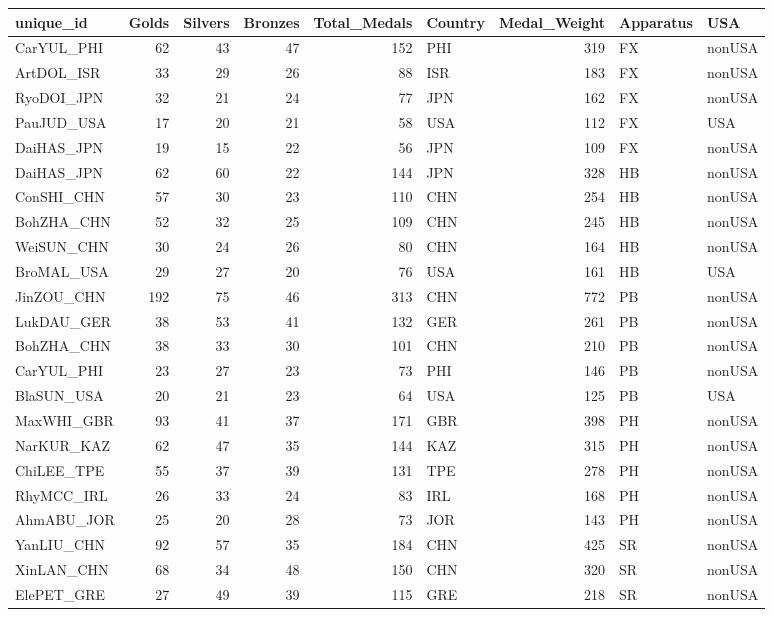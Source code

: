 \documentclass[
  letterpaper,
  DIV=11,
  numbers=noendperiod]{scrartcl}
\begin{document}
\begin{tabular}{l|r|r|r|r|l|r|l|l}
\hline
unique\_id & Golds & Silvers & Bronzes & Total\_Medals & Country & Medal\_Weight & Apparatus & USA\\
\hline
CarYUL\_PHI & 62 & 43 & 47 & 152 & PHI & 319 & FX & nonUSA\\
\hline
ArtDOL\_ISR & 33 & 29 & 26 & 88 & ISR & 183 & FX & nonUSA\\
\hline
RyoDOI\_JPN & 32 & 21 & 24 & 77 & JPN & 162 & FX & nonUSA\\
\hline
PauJUD\_USA & 17 & 20 & 21 & 58 & USA & 112 & FX & USA\\
\hline
DaiHAS\_JPN & 19 & 15 & 22 & 56 & JPN & 109 & FX & nonUSA\\
\hline
DaiHAS\_JPN & 62 & 60 & 22 & 144 & JPN & 328 & HB & nonUSA\\
\hline
ConSHI\_CHN & 57 & 30 & 23 & 110 & CHN & 254 & HB & nonUSA\\
\hline
BohZHA\_CHN & 52 & 32 & 25 & 109 & CHN & 245 & HB & nonUSA\\
\hline
WeiSUN\_CHN & 30 & 24 & 26 & 80 & CHN & 164 & HB & nonUSA\\
\hline
BroMAL\_USA & 29 & 27 & 20 & 76 & USA & 161 & HB & USA\\
\hline
JinZOU\_CHN & 192 & 75 & 46 & 313 & CHN & 772 & PB & nonUSA\\
\hline
LukDAU\_GER & 38 & 53 & 41 & 132 & GER & 261 & PB & nonUSA\\
\hline
BohZHA\_CHN & 38 & 33 & 30 & 101 & CHN & 210 & PB & nonUSA\\
\hline
CarYUL\_PHI & 23 & 27 & 23 & 73 & PHI & 146 & PB & nonUSA\\
\hline
BlaSUN\_USA & 20 & 21 & 23 & 64 & USA & 125 & PB & USA\\
\hline
MaxWHI\_GBR & 93 & 41 & 37 & 171 & GBR & 398 & PH & nonUSA\\
\hline
NarKUR\_KAZ & 62 & 47 & 35 & 144 & KAZ & 315 & PH & nonUSA\\
\hline
ChiLEE\_TPE & 55 & 37 & 39 & 131 & TPE & 278 & PH & nonUSA\\
\hline
RhyMCC\_IRL & 26 & 33 & 24 & 83 & IRL & 168 & PH & nonUSA\\
\hline
AhmABU\_JOR & 25 & 20 & 28 & 73 & JOR & 143 & PH & nonUSA\\
\hline
YanLIU\_CHN & 92 & 57 & 35 & 184 & CHN & 425 & SR & nonUSA\\
\hline
XinLAN\_CHN & 68 & 34 & 48 & 150 & CHN & 320 & SR & nonUSA\\
\hline
ElePET\_GRE & 27 & 49 & 39 & 115 & GRE & 218 & SR & nonUSA\\

\end{tabular}
\end{document}
